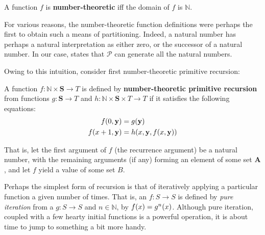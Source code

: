 \begin{definition} A function $f$ is \textbf{number-theoretic} iff the domain
of $f$ is $\mathbb{N}$. \end{definition}

For various reasons, the number-theoretic function definitions were perhaps the
first to obtain such a means of partitioning. Indeed, a natural number has
perhaps a natural interpretation as either zero, or the successor of a natural
number\cite{beman-1901, rose-1984, odifreddi-1989}. In our case,
 states that $\mathcal{P}$ can generate all the
natural numbers.

Owing to this intuition, consider first number-theoretic primitive recursion:

\begin{definition} A function $f : \mathbb{N} \times \mathbf{S} \rightarrow T$
is defined by \textbf{number-theoretic primitive recursion} from functions $g :
\mathbf{S} \rightarrow T$ and $h : \mathbb{N} \times \mathbf{S} \times T
\rightarrow T$ if it satisfies the following equations: \begin{align*}
%
f\p{0, \mathbf{y}} &= g\p{\mathbf{y}}\\
%
f\p{x+1, \mathbf{y}} &= h\p{x,\mathbf{y},f\p{x,\mathbf{y}}}
%
\end{align*} \end{definition}

That is, let the first argument of $f$ (the recurrence argument) be a natural
number, with the remaining arguments (if any) forming an element of some set
$\mathbf{A}$, and let $f$ yield a value of some set $B$. 

Perhaps the simplest form of recursion is that of iteratively applying a
particular function a given number of times.  That is, an $f : S \rightarrow S$
is defined by \emph{pure iteration} from a $g : S \rightarrow S$ and $n \in
\mathbb{N}$, by $f{\mathopen{}\left({x}\right)\mathclose{}} = g^n{\mathopen{}\left({x}\right)\mathclose{}}$. Although pure iteration, coupled with a
few hearty initial functions is a powerful operation\cite{rose-1984}, it is
about time to jump to something a bit more handy.

\begin{definition} \end{definition}





